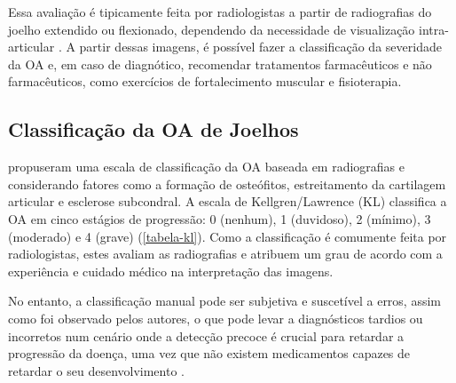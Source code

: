 Essa avaliação é tipicamente feita por radiologistas a partir de radiografias do joelho extendido ou flexionado, dependendo da necessidade de visualização intra-articular \citep{Braun2012}. A partir dessas imagens, é possível fazer a classificação da severidade da OA e, em caso de diagnótico, recomendar tratamentos farmacêuticos e não farmacêuticos, como exercícios de fortalecimento muscular e fisioterapia.

\subsection{Classificação da OA de Joelhos}

\cite{KELLGREN1957} propuseram uma escala de classificação da OA baseada em radiografias e considerando fatores como a formação de osteófitos, estreitamento da cartilagem articular e esclerose subcondral. A escala de Kellgren/Lawrence (KL) classifica a OA em cinco estágios de progressão: 0 (nenhum), 1 (duvidoso), 2 (mínimo), 3 (moderado) e 4 (grave) (\autoref{tabela-kl}). Como a classificação é comumente feita por radiologistas, estes avaliam as radiografias e atribuem um grau de acordo com a experiência e cuidado médico na interpretação das imagens.

No entanto, a classificação manual pode ser subjetiva e suscetível a erros, assim como foi observado pelos autores, o que pode levar a diagnósticos tardios ou incorretos num cenário onde a detecção precoce é crucial para retardar a progressão da doença, uma vez que não existem medicamentos capazes de retardar o seu desenvolvimento .


